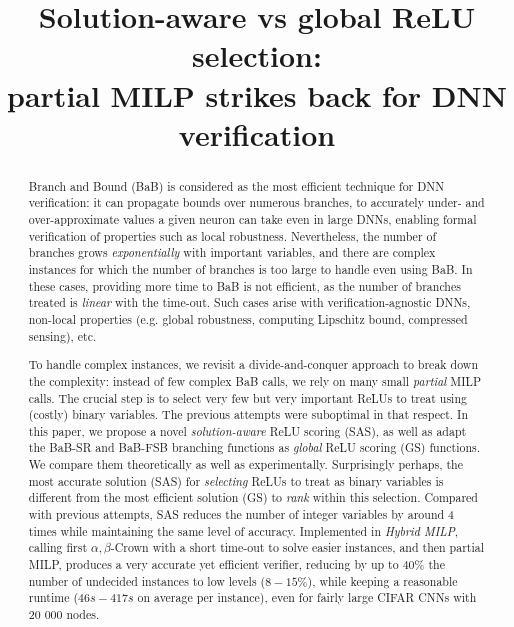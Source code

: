 \documentclass{llncs}
\title{Solution-aware vs global ReLU selection: \\
partial MILP strikes back for DNN verification}
\date{}
\begin{document}
	
	\maketitle
	
	\begin{abstract}
		Branch and Bound (BaB) is considered as the most efficient technique for DNN verification: it can propagate bounds over numerous branches, to accurately under- and over-approximate values a given neuron can take even in large DNNs, enabling formal verification of properties such as local robustness. Nevertheless, the number of branches grows {\em exponentially} with important variables, and there are complex instances for which the number of branches is too large to handle even using BaB. In these cases, providing more time to BaB is not efficient, as the number of branches treated is {\em linear} with the time-out. Such cases arise with verification-agnostic DNNs, non-local properties (e.g. global robustness, computing Lipschitz bound, compressed sensing), etc. 
				
        To handle complex instances, we revisit a divide-and-conquer approach to break down the complexity: instead of few complex BaB calls, we rely on many small {\em partial} MILP calls. The crucial step is to select very few but very important ReLUs to treat using (costly) binary variables. The previous attempts were suboptimal in that respect. In this paper, we propose a novel {\em solution-aware} ReLU scoring (SAS), as well as adapt the BaB-SR and BaB-FSB branching functions as {\em global} ReLU scoring (GS) functions. We compare them theoretically as well as experimentally. Surprisingly perhaps, the most accurate solution (SAS) for {\em selecting} ReLUs to treat as binary variables is different from the most efficient solution (GS) to {\em rank} within this selection. Compared with previous attempts, SAS reduces the number of integer variables by around 4 times while maintaining the same level of accuracy. Implemented in {\em Hybrid MILP}, calling first $\alpha,\beta$-Crown with a short time-out to solve easier instances, and then partial MILP, produces a very accurate yet efficient verifier, reducing by up to $40\%$ the number of undecided instances to low levels ($8-15\%$), while keeping a reasonable runtime ($46s-417s$ on average per instance), even for fairly large CIFAR CNNs with 20 000 nodes.


\end{abstract}
\end{document}
